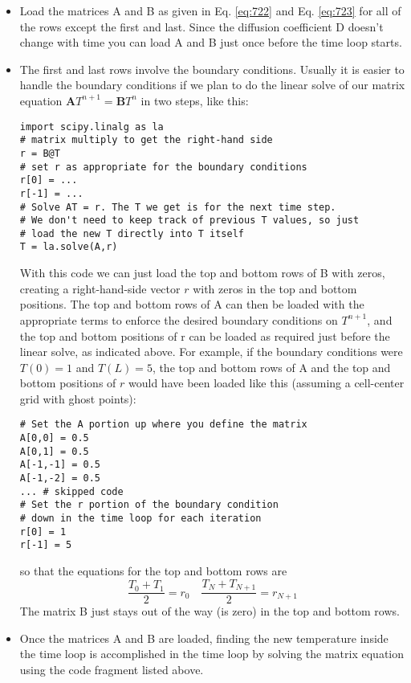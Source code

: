 \begin{itemize}
\item Load the matrices A and B as given in Eq. \eqref{eq:722} and Eq. \eqref{eq:723} for all of
the rows except the first and last. Since the diffusion coefficient D doesn\rq t
change with time you can load A and B just once before the time loop starts.
\item The first and last rows involve the boundary conditions. Usually it is easier
to handle the boundary conditions if we plan to do the linear solve of our matrix equation $\mathbf{A} T^{n+1}=\mathbf{B} T^{n}$ in two steps, like this:
\begin{lstlisting}
import scipy.linalg as la
# matrix multiply to get the right-hand side
r = B@T
# set r as appropriate for the boundary conditions
r[0] = ...
r[-1] = ...
# Solve AT = r. The T we get is for the next time step.
# We don't need to keep track of previous T values, so just
# load the new T directly into T itself
T = la.solve(A,r)
\end{lstlisting}
With this code we can just load the top and bottom rows of B with zeros, creating a right-hand-side vector $r$ with zeros in the top and bottom positions.
The top and bottom rows of A can then be loaded with the appropriate
terms to enforce the desired boundary conditions on $T^{n+1}$, and the top and
bottom positions of r can be loaded as required just before the linear solve,
as indicated above. For example, if the boundary conditions were $T (0) = 1$ and $T (L) = 5$, the top
and bottom rows of A and the top and bottom positions of $r$ would have
been loaded like this (assuming a cell-center grid with ghost points):
\begin{lstlisting}
# Set the A portion up where you define the matrix
A[0,0] = 0.5
A[0,1] = 0.5
A[-1,-1] = 0.5
A[-1,-2] = 0.5
... # skipped code
# Set the r portion of the boundary condition
# down in the time loop for each iteration
r[0] = 1
r[-1] = 5
\end{lstlisting}
so that the equations for the top and bottom rows are
\begin{equation}\label{eq:725}
\frac{T_{0}+T_{1}}{2}=r_{0} \quad \frac{T_{N}+T_{N+1}}{2}=r_{N+1}
\end{equation}
The matrix B just stays out of the way (is zero) in the top and bottom rows.
\item  Once the matrices A and B are loaded, finding the new temperature inside the time loop is accomplished in the time loop by solving the matrix
equation using the code fragment listed above.
\end{itemize}
